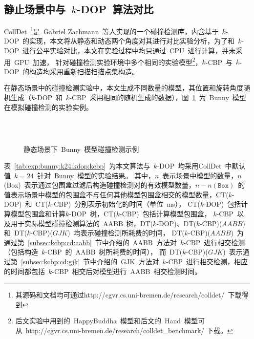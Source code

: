 \subsection{静止场景中与~$k$-DOP~算法对比}
\label{subsec:exper:kdop:kcbp:static}

CollDet~\footnote{其源码和文档均可通过http://cgvr.cs.uni-bremen.de/research/colldet/~下载得到}是~Gabriel Zachmann~等人实现的一个碰撞检测库\cite{abenchmarking2007}，内含基于~$k$-DOP~的实现，本文将从静态和动态两个角度对其进行对比实验分析，为了和~$k$-DOP~进行公平实验对比，本文在实验过程中均只通过~CPU~进行计算，并未采用~GPU~加速，
针对碰撞检测实验环境中多个相同的实验模型\footnote{后文实验中用到的~HappyBuddha~模型和后文的~Hand~模型可从~http://cgvr.cs.uni-bremen.de/research/colldet\_benchmark/ 下载。}，$k$-CBP~与~$k$-DOP~的构造均采用重新扫描扫描点集构造。

在静态场景中的碰撞检测实验中，本文生成不同数量的模型，其位置和旋转角度随机生成（$k$-DOP~和~$k$-CBP~采用相同的随机生成的数据），图~\ref{fig:static:cd:bunny}~为~Bunny~模型在模拟碰撞检测的实验实例。

\begin{figure}[htb]
\centering
{} 
\\ 
\\
\caption{静态场景下~Bunny~模型碰撞检测示例}
\label{fig:static:cd:bunny}
\end{figure}

表~\ref{tab:exp:bunny:k24:kdop:kcbp}~为本文算法与~$k$-DOP~均采用CollDet~中默认值~$k=24$~针对~Bunny~模型的实验结果。
其中，$n$~表示场景中模型的数量，$n$(Box)~表示通过包围盒过滤后构造碰撞检测对的有效模型数量，$n-n(\texttt{Box})$~的值表示场景中模型的包围盒不与任何其他模型包围盒相交的模型数量，CT($k$-DOP)~和~CT($k$-CBP)~分别表示初始化的时间（单位~ms）， CT($k$-DOP)~包括计算模型包围盒和计算$k$-DOP~树，CT($k$-CBP)~包括计算模型包围盒，
$k$-CBP~以及用于实际模型碰撞检测算法的~AABB~树，DT($k$-DOP)、DT($k$-CBP)($AABB$) 和~DT($k$-CBP)($GJK$)~均表示碰撞检测所耗费的时间， 
DT($k$-CBP)($AABB$)~为通过第~\ref{subsec:kcbp:cd:aabb}~节中介绍的~AABB~方法对~$k$-CBP~进行相交检测（包括构造~$k$-CBP~的~AABB~树所耗费的时间），
而~DT($k$-CBP)($GJK$)~表示通过第~\ref{subsec:kcbp:cd:gjk}~节中介绍的~GJK~方法对~$k$-CBP~进行相交检测，相应的时间都包括~$k$-CBP~相交后对模型进行~AABB~相交检测时间。

